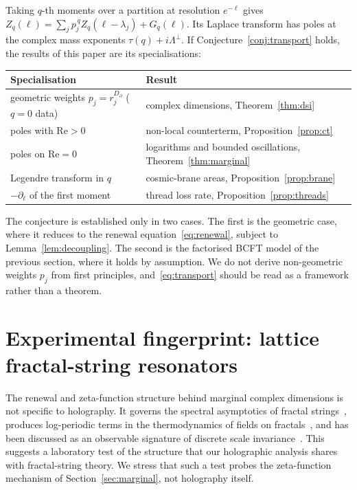 \documentclass[11pt]{article}
\theoremstyle{definition}\newtheorem{definition}{Definition}[section]
\theoremstyle{remark}\newtheorem*{remark}{Remark}
\begin{document}
Taking $q$-th moments over a partition at resolution $e^{-\ell}$ gives
$Z_q(\ell)=\sum_jp_j^{\,q}Z_q(\ell-\lambda_j)+G_q(\ell)$. Its Laplace transform has poles at the complex mass
exponents $\tau(q)+i\Lambda^\perp$. If Conjecture~\ref{conj:transport} holds, the results of this paper are
its specialisations:
\begin{center}
\begin{tabular}{ll}
\toprule
Specialisation & Result\\
\midrule
geometric weights $p_j=r_j^{D_\partial}$ ($q=0$ data) & complex dimensions, Theorem~\ref{thm:dsi}\\
poles with $\mathrm{Re}>0$ & non-local counterterm, Proposition~\ref{prop:ct}\\
poles on $\mathrm{Re}=0$ & logarithms and bounded oscillations, Theorem~\ref{thm:marginal}\\
Legendre transform in $q$ & cosmic-brane areas, Proposition~\ref{prop:brane}\\
$-\partial_\ell$ of the first moment & thread loss rate, Proposition~\ref{prop:threads}\\
\bottomrule
\end{tabular}
\end{center}
The conjecture is established only in two cases. The first is the geometric case, where it reduces to the
renewal equation~\eqref{eq:renewal}, subject to Lemma~\ref{lem:decoupling}. The second is the factorised BCFT
model of the previous section, where it holds by assumption. We do not derive non-geometric weights $p_j$ from
first principles, and~\eqref{eq:transport} should be read as a framework rather than a theorem.

\section{Experimental fingerprint: lattice fractal-string resonators}
\label{sec:exp}
The renewal and zeta-function structure behind marginal complex dimensions is not specific to holography.
It governs the spectral asymptotics of fractal strings~\cite{LvF}, produces log-periodic terms in the
thermodynamics of fields on fractals~\cite{ADT}, and has been discussed as an observable signature of
discrete scale invariance~\cite{Calcagni}. This suggests a laboratory test of the structure that our
holographic analysis shares with fractal-string theory. We stress that such a test probes the
zeta-function mechanism of Section~\ref{sec:marginal}, not holography itself.
\end{document}
